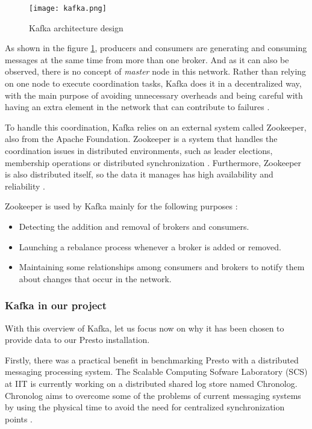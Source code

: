 \documentclass[conference]{IEEEtran}
\begin{document}
\begin{figure}[htbp]
\centerline{\texttt{[image: kafka.png]}}
\caption{Kafka architecture design \cite{kreps-2011}}
\label{kafka_arch}
\end{figure}

As shown in the figure \ref{kafka_arch}, producers and consumers are generating and consuming messages at the same time from more than one broker. And as it can also be observed, there is no concept of \textit{master} node in this network. Rather than relying on one node to execute coordination tasks, Kafka does it in a decentralized way, with the main purpose of avoiding unnecessary overheads and being careful with having an extra element in the network that can contribute to failures \cite{kreps-2011}.

To handle this coordination, Kafka relies on an external system called Zookeeper, also from the Apache Foundation. Zookeeper is a system that handles the coordination issues in distributed environments, such as leader elections, membership operations or distributed synchronization \cite{haloi2015apache}. Furthermore, Zookeeper is also distributed itself, so the data it manages has high availability and reliability \cite{the-apache-software-foundation-2021}.

Zookeeper is used by Kafka mainly for the following purposes \cite{kreps-2011}:

\begin{itemize}
    \item Detecting the addition and removal of brokers and consumers.
    \item Launching a rebalance process whenever a broker is added or removed.
    \item Maintaining some relationships among consumers and brokers to notify them about changes that occur in the network.
\end{itemize}

\subsubsection{Kafka in our project}
With this overview of Kafka, let us focus now on why it has been chosen to provide data to our Presto installation.

Firstly, there was a practical benefit in benchmarking Presto with a distributed messaging processing system. The Scalable Computing Sofware Laboratory (SCS) at IIT is currently working on a distributed shared log store named Chronolog. Chronolog aims to overcome some of the problems of current messaging systems by using the physical time to avoid the need for centralized synchronization points \cite{chronolog}.
\end{document}
